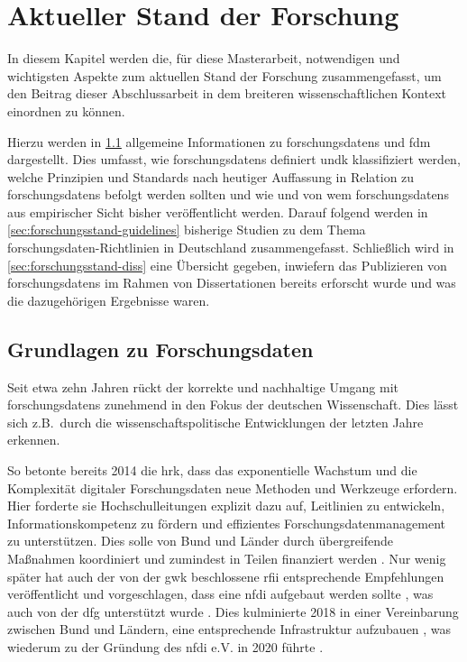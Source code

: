 \chapter{Aktueller Stand der Forschung}\label{ch:forschungsstand}
In diesem Kapitel werden die, für diese Masterarbeit, notwendigen und wichtigsten Aspekte zum aktuellen Stand der Forschung zusammengefasst, um den Beitrag dieser Abschlussarbeit in dem breiteren wissenschaftlichen Kontext einordnen zu können.

Hierzu werden in \cref{sec:forschungsstand-basics} allgemeine Informationen zu \glspl{forschungsdaten} und \gls{fdm} dargestellt.
Dies umfasst, wie \glspl{forschungsdaten} definiert undk klassifiziert werden, welche Prinzipien und Standards nach heutiger Auffassung in Relation zu \glspl{forschungsdaten} befolgt werden sollten und wie und von wem \glspl{forschungsdaten} aus empirischer Sicht bisher veröffentlicht werden.
Darauf folgend werden in \cref{sec:forschungsstand-guidelines} bisherige Studien zu dem Thema \gls{forschungsdaten}-Richtlinien in Deutschland zusammengefasst.
Schließlich wird in \cref{sec:forschungsstand-diss} eine Übersicht gegeben, inwiefern das Publizieren von \glspl{forschungsdaten} im Rahmen von Dissertationen bereits erforscht wurde und was die dazugehörigen Ergebnisse waren.

\section{Grundlagen zu Forschungsdaten}\label{sec:forschungsstand-basics}
Seit etwa zehn Jahren rückt der korrekte und nachhaltige Umgang mit \glspl{forschungsdaten} zunehmend in den Fokus der deutschen Wissenschaft.
Dies lässt sich z.B.~durch die wissenschaftspolitische Entwicklungen der letzten Jahre erkennen.

So betonte bereits 2014 die \gls{hrk}, dass das exponentielle Wachstum und die Komplexität digitaler Forschungsdaten neue Methoden und Werkzeuge erfordern.
Hier forderte sie Hochschulleitungen explizit dazu auf, Leitlinien zu entwickeln, Informationskompetenz zu fördern und effizientes Forschungsdatenmanagement zu unterstützen.
Dies solle von Bund und Länder durch übergreifende Maßnahmen koordiniert und zumindest in Teilen finanziert werden \autocite{hrk-fdm}.
Nur wenig später hat auch der von der \gls{gwk} beschlossene \gls{rfii} entsprechende Empfehlungen veröffentlicht und vorgeschlagen, dass eine \gls{nfdi} aufgebaut werden sollte \autocite{rfii2016}, was auch von der \gls{dfg} unterstützt wurde \autocite{dfg-positionspapier}.
Dies kulminierte 2018 in einer Vereinbarung zwischen Bund und Ländern, eine entsprechende Infrastruktur aufzubauen \autocite{nfdi-agreement}, was wiederum zu der Gründung des \gls{nfdi} e.V. in 2020 führte \autocite{nfdi-foundation}.

